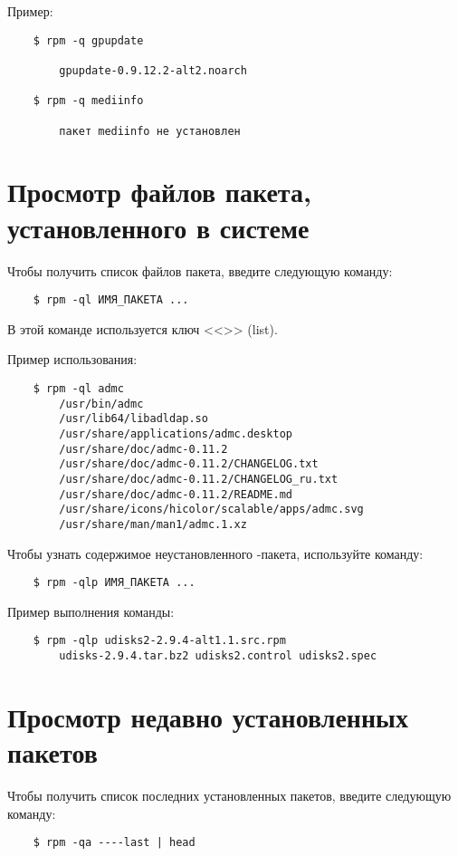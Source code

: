 Пример:
\begin{verbatim}
    $ rpm -q gpupdate

        gpupdate-0.9.12.2-alt2.noarch

    $ rpm -q mediinfo

        пакет mediinfo не установлен
\end{verbatim}

\section{Просмотр файлов пакета, установленного в системе}
Чтобы получить список файлов пакета, введите следующую команду:
\begin{verbatim}
    $ rpm -ql ИМЯ_ПАКЕТА ...
\end{verbatim}

В этой команде используется ключ <<>> (list).


Пример использования:
\begin{verbatim}
    $ rpm -ql admc
        /usr/bin/admc
        /usr/lib64/libadldap.so
        /usr/share/applications/admc.desktop
        /usr/share/doc/admc-0.11.2
        /usr/share/doc/admc-0.11.2/CHANGELOG.txt
        /usr/share/doc/admc-0.11.2/CHANGELOG_ru.txt
        /usr/share/doc/admc-0.11.2/README.md
        /usr/share/icons/hicolor/scalable/apps/admc.svg
        /usr/share/man/man1/admc.1.xz
\end{verbatim}

Чтобы узнать содержимое неустановленного -пакета, используйте команду:
\begin{verbatim}
    $ rpm -qlp ИМЯ_ПАКЕТА ...
\end{verbatim}

Пример выполнения команды:
\begin{verbatim}
    $ rpm -qlp udisks2-2.9.4-alt1.1.src.rpm
        udisks-2.9.4.tar.bz2 udisks2.control udisks2.spec
\end{verbatim}

\section{Просмотр недавно установленных пакетов}\label{view-recently-installed-packages}
Чтобы получить список последних установленных пакетов, введите следующую команду:

\begin{verbatim}
    $ rpm -qa ----last | head
\end{verbatim}

